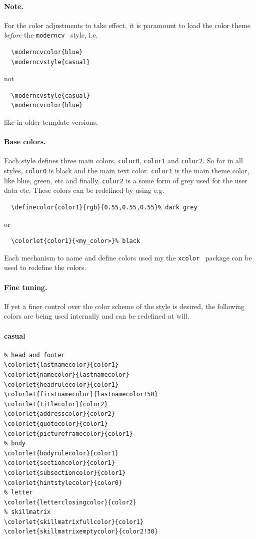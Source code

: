 \documentclass[a4paper,11pt]{article}
\newcommand{\code}[1]{\lstinline!#1!}
\newcommand{\Code}[1]{\lstinline!#1!~} %
\newcommand{\moderncv}{\code{moderncv}}
\begin{document}
\paragraph{Note.} For the color adjustments to take effect, it is paramount to load the color theme \emph{before} the \moderncv~ style, i.e.

\begin{lstlisting}
  \moderncvcolor{blue}
  \moderncvstyle{casual}
\end{lstlisting}
not
\begin{lstlisting}
  \moderncvstyle{casual}
  \moderncvcolor{blue}
\end{lstlisting}
like in older template versions.

\paragraph{Base colors.} Each style defines three main colors, \code{color0}, \code{color1} and \code{color2}. So far in all styles, \code{color0} is black and the main text color. \code{color1} is the main theme color, like blue, green, etc and finally, \code{color2} is a some form of grey used for the user data etc. These colors can be redefined by using e.g.

\begin{lstlisting}
  \definecolor{color1}{rgb}{0.55,0.55,0.55}% dark grey
\end{lstlisting}
or
\begin{lstlisting}
  \colorlet{color1}{<my_color>}% black
\end{lstlisting}
Each mechanism to name and define colors used my the \Code{xcolor} package can be used to redefine the colors.

\paragraph{Fine tuning.} If yet a finer control over the color scheme of the style is desired, the following colors are being used internally and can be redefined at will.

\paragraph{casual}
\begin{lstlisting}
% head and footer
\colorlet{lastnamecolor}{color1}
\colorlet{namecolor}{lastnamecolor}
\colorlet{headrulecolor}{color1}
\colorlet{firstnamecolor}{lastnamecolor!50}
\colorlet{titlecolor}{color2}
\colorlet{addresscolor}{color2}
\colorlet{quotecolor}{color1}
\colorlet{pictureframecolor}{color1}
% body
\colorlet{bodyrulecolor}{color1}
\colorlet{sectioncolor}{color1}
\colorlet{subsectioncolor}{color1}
\colorlet{hintstylecolor}{color0}
% letter
\colorlet{letterclosingcolor}{color2}
% skillmatrix
\colorlet{skillmatrixfullcolor}{color1}
\colorlet{skillmatrixemptycolor}{color2!30}

\end{lstlisting}
\end{document}
